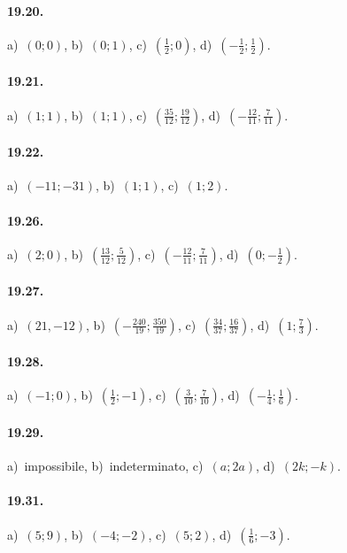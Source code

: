 \paragraph{19.20.} a)~$(0;0)$, \quad b)~$(0;1)$, \quad c)~$\left(\frac{1}{2};0\right)$, \quad d)~$\left(-{\frac{1}{2}};\frac{1}{2}\right)$.

\paragraph{19.21.} a)~$(1;1)$, \quad b)~$(1;1)$, \quad c)~$\left(\frac{35}{12};\frac{19}{12}\right)$, \quad d)~$\left(-{\frac{12}{11}};\frac{7}{11}\right)$.

\paragraph{19.22.} a)~$(-11;-31)$, \quad b)~$(1;1)$, \quad c)~$(1;2)$.

\paragraph{19.26.} a)~$(2;0)$, \quad b)~$\left(\frac{13}{12};\frac{5}{12}\right)$, \quad c)~$\left(-{\frac{12}{11}};\frac{7}{11}\right)$, \quad d)~$\left(0;-\frac{1}{2}\right)$.

\paragraph{19.27.} a)~$(21,-12)$, \quad b)~$\left(-{\frac{240}{19}};\frac{350}{19}\right)$, \quad c)~$\left(\frac{34}{37};\frac{16}{37}\right)$, \quad d)~$\left(1;\frac{7}{3}\right)$.

\paragraph{19.28.} a)~$\left(-1;0\right)$, \quad b)~$\left(\frac{1}{2};-1\right)$, \quad c)~$\left(\frac{3}{10};\frac{7}{10}\right)$, \quad d)~$\left(-{\frac{1}{4}};\frac{1}{6}\right)$.

\paragraph{19.29.} a)~impossibile, \quad b)~indeterminato, \quad c)~$(a;2a)$, \quad d)~$(2k;-k)$.

\paragraph{19.31.} a)~$\left(5;9\right)$, \quad b)~$\left(-4;-2\right)$, \quad c)~$\left(5;2\right)$, \quad d)~$\left({\frac{1}{6}};-3\right)$.

